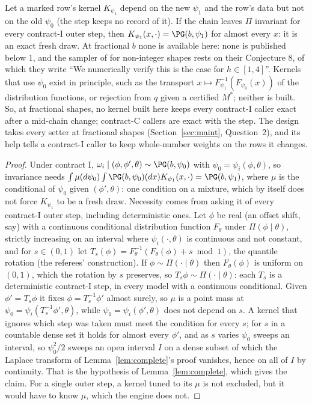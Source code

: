 \begin{corollary}\label{cor:frac}
Let a marked row's kernel $K_{\psi_1}$ depend on the new $\psi_1$ and the row's data but not on the old $\psi_0$
(the step keeps no record of it). If the chain leaves $\Pi$ invariant for every contract-I outer step, then
$K_{\psi_1}(x,\cdot)=\PG(b,\psi_1)$ for almost every $x$: it is an exact fresh draw. At fractional $b$ none is available here: none is published below 1, and the sampler of
\cite[Sec.~4]{wps} for non-integer shapes rests on their Conjecture 8, of which they write ``We numerically verify this is the case for $h\in[1,4]$''.
Kernels that use $\psi_0$ exist in principle, such as the transport $x\mapsto F_{\psi_1}^{-1}(F_{\psi_0}(x))$ of
the distribution functions, or rejection from $q$ given a certified $M^*$; neither is built. So, at fractional
shapes, no kernel built here keeps every contract-I caller exact after a mid-chain change; contract-C callers are
exact with the step. The design takes every setter at fractional shapes (Section~\ref{sec:maint}, Question~2),
and its help tells a contract-I caller to keep whole-number weights on the rows it changes.
\end{corollary}
\begin{proof}
Under contract I, $\omega_i\mid(\phi,\phi',\theta)\sim\PG(b,\psi_0)$ with $\psi_0=\psi_i(\phi,\theta)$, so
invariance needs $\int\mu(d\psi_0)\int\PG(b,\psi_0)(dx)K_{\psi_1}(x,\cdot)=\PG(b,\psi_1)$, where $\mu$ is the
conditional of $\psi_0$ given $(\phi',\theta)$: one condition on a mixture, which by itself does not force
$K_{\psi_1}$ to be a fresh draw. Necessity comes from asking it of every contract-I outer step, including
deterministic ones. Let $\phi$ be real (an offset shift, say) with a continuous conditional distribution function
$F_\theta$ under $\Pi(\phi\mid\theta)$, strictly increasing on an interval where $\psi_i(\cdot,\theta)$ is continuous
and not constant, and for $s\in(0,1)$ let $T_s(\phi)=F_\theta^{-1}(F_\theta(\phi)+s\bmod1)$, the quantile rotation
(the referees' construction). If $\phi\sim\Pi(\cdot\mid\theta)$ then $F_\theta(\phi)$ is uniform on $(0,1)$, which
the rotation by $s$ preserves, so $T_s\phi\sim\Pi(\cdot\mid\theta)$: each $T_s$ is a deterministic contract-I step,
in every model with a continuous conditional. Given $\phi'=T_s\phi$ it fixes $\phi=T_s^{-1}\phi'$ almost surely, so
$\mu$ is a point mass at $\psi_0=\psi_i(T_s^{-1}\phi',\theta)$, while $\psi_1=\psi_i(\phi',\theta)$ does not depend
on $s$. A kernel that ignores which step was taken must meet the condition for every $s$; for $s$ in a countable
dense set it holds for almost every $\phi'$, and as $s$ varies $\psi_0$ sweeps an interval, so $\psi_0^2/2$ sweeps an
open interval $I$ on a dense subset of which the Laplace transform of Lemma~\ref{lem:complete}'s proof vanishes,
hence on all of $I$ by continuity. That is the hypothesis of Lemma~\ref{lem:complete}, which gives the claim. For a single outer step, a kernel tuned to its $\mu$ is not
excluded, but it would have to know $\mu$, which the engine does not.
\end{proof}

